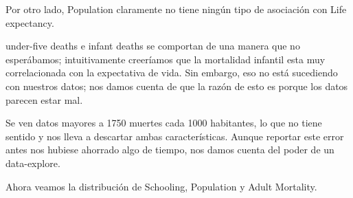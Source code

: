 \begin{itemize}
   Por otro lado, Population claramente no tiene ningún tipo de asociación con Life expectancy. 
   
   under-five deaths e infant deaths se comportan de una manera que no esperábamos; intuitivamente creeríamos que la mortalidad infantil esta muy correlacionada con la expectativa de vida. Sin embargo, eso no está sucediendo con nuestros datos; nos damos cuenta de que la razón de esto es porque los datos parecen estar mal.
   
   Se ven datos mayores a 1750 muertes cada 1000 habitantes, lo que no tiene sentido y nos lleva a descartar ambas características. Aunque reportar este error antes nos hubiese ahorrado algo de tiempo, nos damos cuenta del poder de un data-explore.
   
   
    Ahora veamos la distribución de Schooling, Population y Adult Mortality.
        

\end{itemize}
